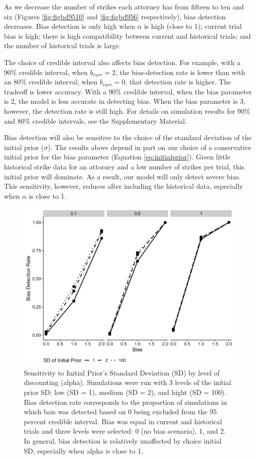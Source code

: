 \documentclass[12pt]{article}
\begin{document}
As we decrease the number of strikes each attorney has from fifteen to ten and six (Figures \ref{fig:figbd9510} and \ref{fig:figbd956} respectively), bias detection decreases. Bias detection is only high when \(\alpha\) is high (close to 1); current trial bias is high; there is high compatibility between current and historical trials; and the number of historical trials is large.

The choice of credible interval also affects bias detection. For example, with a 90\% credible interval, when \(b_{curr}=2\), the bias-detection rate is lower than with an 80\% credible interval; when \(b_{curr}=0\), that detection rate is higher. The tradeoff is lower accuracy. With a 90\% credible interval, when the bias parameter is 2, the model is less accurate in detecting bias. When the bias parameter is 3, however, the detection rate is still high. For details on simulation results for 90\% and 80\% credible intervals, see the Supplementary Material.

Bias detection will also be sensitive to the choice of the standard deviation of the initial prior (\(\sigma\)). The results above depend in part on our choice of a conservative initial prior for the bias parameter (Equation \eqref{eq:initialprior}). Given little historical strike data for an attorney and a low number of strikes per trial, this initial prior will dominate. As a result, our model will only detect severe bias. This sensitivity, however, reduces after including the historical data, especially when \(\alpha\) is close to 1.

\begin{figure}

{\centering \includegraphics[width=0.8\linewidth]{../figures/SD_sensitivity} 

}

\caption{Sensitivity to Initial Prior's Standard Deviation (SD) by level of discounting (alpha). Simulations were run with 3 levels of the initial prior SD: low (SD = 1), medium (SD = 2), and hight (SD = 100). Bias detection rate corresponds to the proportion of simulations in which bais was detected based on 0 being excluded from the 95 percent credible interval. Bias was equal in current and historical trials and three levels were selected: 0 (no bias scenario), 1, and 2. In general, bias detection is relatively unaffected by choice initial SD, especially when alpha is close to 1.}\label{fig:figsdprior}
\end{figure}
\end{document}
